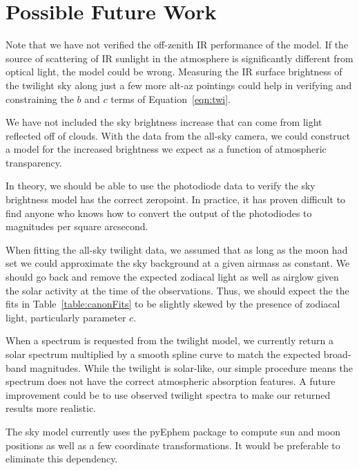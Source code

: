 \documentclass[]{spie}
\begin{document}
\section{Possible Future Work}

Note that we have not verified the off-zenith IR performance of the model. If the source of scattering of IR sunlight in the atmosphere is significantly different from optical light, the model could be wrong. Measuring the IR surface brightness of the twilight sky along just a few more alt-az pointings could help in verifying and constraining the $b$ and $c$ terms of Equation~\ref{eqn:twi}.

We have not included the sky brightness increase that can come from light reflected off of clouds.  With the data from the all-sky camera, we could construct a model for the increased brightness we expect as a function of atmospheric transparency.  

In theory, we should be able to use the photodiode data to verify the sky brightness model has the correct zeropoint. In practice, it has proven difficult to find anyone who knows how to convert the output of the photodiodes to magnitudes per square arcsecond.

When fitting the all-sky twilight data, we assumed that as long as the moon had set we could approximate the sky background at a given airmass as constant. We should go back and remove the expected zodiacal light as well as airglow given the solar activity at the time of the observations. Thus, we should expect the the fits in Table~\ref{table:canonFits} to be slightly skewed by the presence of zodiacal light, particularly parameter $c$.  

When a spectrum is requested from the twilight model, we currently return a solar spectrum multiplied by a smooth spline curve to match the expected broad-band magnitudes.  While the twilight is solar-like, our simple procedure means the spectrum does not have the correct atmospheric absorption features.  A future improvement could be to use observed twilight spectra to make our returned results more realistic.

The sky model currently uses the pyEphem package to compute sun and moon positions as well as a few coordinate transformations. It would be preferable to eliminate this dependency.  




\end{document}
